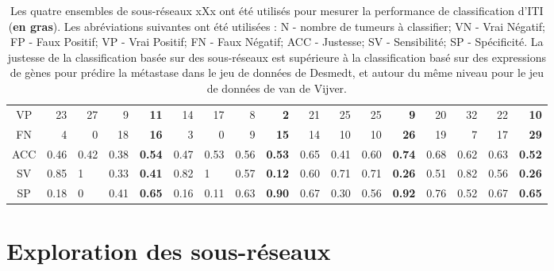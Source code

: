 \begin{sidewaystable}
\begin{center}
\begin{tabular}{crrrrrrrrrrrrrrrr}
            VP        & 23    & 27    & 9     & \textbf{11}                               & 14    & 17    & 8     & \textbf{2}                    & 21    & 25    & 25    & \textbf{9}                                & 20    & 32    & 22    & \textbf{10}                    \\
            FN        & 4     & 0     & 18    & \textbf{16}                               & 3     & 0     & 9     & \textbf{15}                   & 14    & 10    & 10    & \textbf{26}                               & 19    & 7     & 17    & \textbf{29}                    \\
            \midrule
            ACC       & 0.46  & 0.42  & 0.38  & \textbf{0.54}                             & 0.47  & 0.53  & 0.56  & \textbf{0.53}                 & 0.65  & 0.41  & 0.60  & \textbf{0.74}                             & 0.68  & 0.62  & 0.63  & \textbf{0.52}                  \\
            SV        & 0.85  & \multicolumn{1}{l}{1} & 0.33  & \textbf{0.41}             & 0.82  & \multicolumn{1}{l}{1} & 0.57  & \textbf{0.12} & 0.60  & 0.71  & 0.71  & \textbf{0.26}                             & 0.51  & 0.82  & 0.56  & \textbf{0.26}                  \\
            SP        & 0.18  & \multicolumn{1}{l}{0} & 0.41  & \textbf{0.65}             & 0.16  & 0.11                  & 0.63  & \textbf{0.90} & 0.67  & 0.30  & 0.56  & \textbf{0.92}                             & 0.76  & 0.52  & 0.67  & \textbf{0.65}                  \\
            \bottomrule
          \end{tabular}
          \label{tab:Res2Classif}
          \vspace{5ex}
          \caption*{Les quatre ensembles de sous-réseaux xXx ont été utilisés pour mesurer la performance de classification d'ITI (\textbf{en gras}). Les abréviations suivantes ont été utilisées : N - nombre de tumeurs à classifier; VN - Vrai Négatif; FP - Faux Positif; VP - Vrai Positif; FN - Faux Négatif; ACC - Justesse; SV - Sensibilité; SP - Spécificité. La justesse de la classification basée sur des sous-réseaux est supérieure à la classification basé sur des expressions de gènes pour prédire la métastase dans le jeu de données de Desmedt, et autour du même niveau pour le jeu de données de van de Vijver.}
        \end{center}
      \end{sidewaystable}

  	\section{\textcolor{mygreen}{Exploration des sous-réseaux}}

